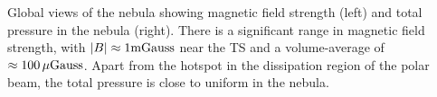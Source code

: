 \label{fig:slices} Global views of the nebula showing magnetic field strength (left) and total pressure in the nebula (right).  There is a significant range in magnetic field strength, with $|B|\approx1\rm mGauss$ near the TS and a volume-average of $\approx 100\, \mu\rm Gauss$.  Apart from the hotspot in the dissipation region of the polar beam, the total pressure is close to uniform in the nebula.
